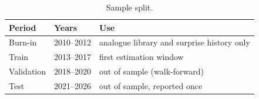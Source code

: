 \begin{table}[htbp]
  \centering\small
  \caption{Sample split.}\label{tab:split}
  \begin{tabular}{lll}
    \toprule
    Period & Years & Use \\
    \midrule
    Burn-in    & 2010--2012 & analogue library and surprise history only \\
    Train      & 2013--2017 & first estimation window \\
    Validation & 2018--2020 & out of sample (walk-forward) \\
    Test       & 2021--2026 & out of sample, reported once \\
    \bottomrule
  \end{tabular}
\end{table}
